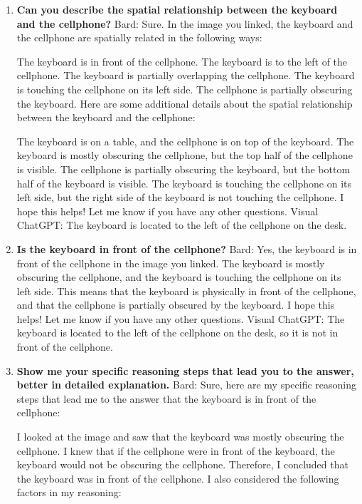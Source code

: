     \begin{enumerate}
        \item \textbf{Can you describe the spatial relationship between the keyboard and the cellphone?}
        \subitem Bard: 
        Sure. In the image you linked, the keyboard and the cellphone are spatially related in the following ways:
        
        The keyboard is in front of the cellphone.
        The keyboard is to the left of the cellphone.
        The keyboard is partially overlapping the cellphone.
        The keyboard is touching the cellphone on its left side.
        The cellphone is partially obscuring the keyboard.
        Here are some additional details about the spatial relationship between the keyboard and the cellphone:
        
        The keyboard is on a table, and the cellphone is on top of the keyboard.
        The keyboard is mostly obscuring the cellphone, but the top half of the cellphone is visible.
        The cellphone is partially obscuring the keyboard, but the bottom half of the keyboard is visible.
        The keyboard is touching the cellphone on its left side, but the right side of the keyboard is not touching the cellphone.
        I hope this helps! Let me know if you have any other questions.
        \subitem Visual ChatGPT: The keyboard is located to the left of the cellphone on the desk.
        \item \textbf{Is the keyboard in front of the cellphone?}
        \subitem Bard: Yes, the keyboard is in front of the cellphone in the image you linked. The keyboard is mostly obscuring the cellphone, and the keyboard is touching the cellphone on its left side. This means that the keyboard is physically in front of the cellphone, and that the cellphone is partially obscured by the keyboard. I hope this helps! Let me know if you have any other questions.
        \subitem Visual ChatGPT: The keyboard is located to the left of the cellphone on the desk, so it is not in front of the cellphone.
        \item \textbf{Show me your specific reasoning steps that lead you to the answer, better in detailed explanation.}
        \subitem Bard: Sure, here are my specific reasoning steps that lead me to the answer that the keyboard is in front of the cellphone:

        I looked at the image and saw that the keyboard was mostly obscuring the cellphone.
        I knew that if the cellphone were in front of the keyboard, the keyboard would not be obscuring the cellphone.
        Therefore, I concluded that the keyboard was in front of the cellphone.
        I also considered the following factors in my reasoning:
        

\end{enumerate}
